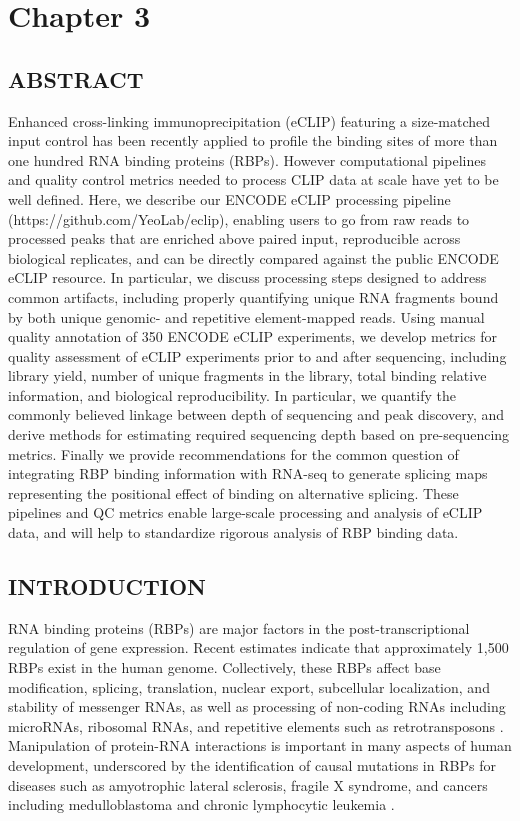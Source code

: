 \chapter{Chapter 3}

\section{ABSTRACT}

Enhanced cross-linking immunoprecipitation (eCLIP) featuring a size-matched input control has been recently applied to profile the binding sites of more than one hundred RNA binding proteins (RBPs). However computational pipelines and quality control metrics needed to process CLIP data at scale have yet to be well defined. Here, we describe our ENCODE eCLIP processing pipeline (https://github.com/YeoLab/eclip), enabling users to go from raw reads to processed peaks that are enriched above paired input, reproducible across biological replicates, and can be directly compared against the public ENCODE eCLIP resource. In particular, we discuss processing steps designed to address common artifacts, including properly quantifying unique RNA fragments bound by both unique genomic- and repetitive element-mapped reads. Using manual quality annotation of 350 ENCODE eCLIP experiments, we develop metrics for quality assessment of eCLIP experiments prior to and after sequencing, including library yield, number of unique fragments in the library, total binding relative information, and biological reproducibility. In particular, we quantify the commonly believed linkage between depth of sequencing and peak discovery, and derive methods for estimating required sequencing depth based on pre-sequencing metrics. Finally we provide recommendations for the common question of integrating RBP binding information with RNA-seq to generate splicing maps representing the positional effect of binding on alternative splicing. These pipelines and QC metrics enable large-scale processing and analysis of eCLIP data, and will help to standardize rigorous analysis of RBP binding data.
 
\section{INTRODUCTION}
RNA binding proteins (RBPs) are major factors in the post-transcriptional regulation of gene expression. Recent estimates indicate that approximately 1,500 RBPs exist in the human genome\cite{Rutherford2008}. Collectively, these RBPs affect base modification, splicing, translation, nuclear export, subcellular localization, and stability of messenger RNAs, as well as processing of non-coding RNAs including microRNAs, ribosomal RNAs, and repetitive elements such as retrotransposons \cite{Bartel2004,Henras2015,Hung2015,Zarnack2013}. Manipulation of protein-RNA interactions is important in many aspects of human development, underscored by the identification of causal mutations in RBPs for diseases such as amyotrophic lateral sclerosis, fragile X syndrome, and cancers including medulloblastoma and chronic lymphocytic leukemia \cite{Daoud2009,Verkerk1991,Pugh2012,Wang2011}.

